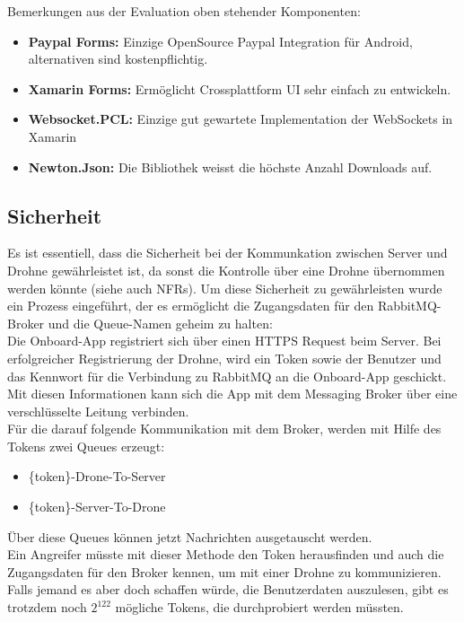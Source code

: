 Bemerkungen aus der Evaluation oben stehender Komponenten:
\begin{itemize}
	\item{\textbf{Paypal Forms:} Einzige OpenSource Paypal Integration für Android, alternativen sind kostenpflichtig.}
	\item{\textbf{Xamarin Forms:} Ermöglicht Crossplattform UI sehr einfach zu entwickeln.}
	\item{\textbf{Websocket.PCL:} Einzige gut gewartete Implementation der WebSockets in Xamarin}
	\item{\textbf{Newton.Json:} Die Bibliothek weisst die höchste Anzahl Downloads auf.}
\end{itemize}

\subsection{Sicherheit}
Es ist essentiell, dass die Sicherheit bei der Kommunkation zwischen Server und Drohne gewährleistet ist, da sonst die Kontrolle über eine Drohne übernommen werden könnte (siehe auch NFRs). Um diese Sicherheit zu gewährleisten wurde ein Prozess eingeführt, der es ermöglicht die Zugangsdaten für den RabbitMQ-Broker und die Queue-Namen geheim zu halten: \\

Die Onboard-App registriert sich über einen HTTPS Request beim Server. Bei erfolgreicher Registrierung der Drohne, wird ein Token sowie der Benutzer und das Kennwort für die Verbindung zu RabbitMQ an die Onboard-App geschickt. Mit diesen Informationen kann sich die App mit dem Messaging Broker über eine verschlüsselte Leitung verbinden.\\

Für die darauf folgende Kommunikation mit dem Broker, werden mit Hilfe des Tokens zwei Queues erzeugt: 
\begin{itemize}
	\item \{token\}-Drone-To-Server
	\item  \{token\}-Server-To-Drone
\end{itemize}

Über diese Queues können jetzt Nachrichten ausgetauscht werden. \\

Ein Angreifer müsste mit dieser Methode den Token herausfinden und auch die Zugangsdaten für den Broker kennen, um mit einer Drohne zu kommunizieren. Falls jemand es aber doch schaffen würde, die Benutzerdaten auszulesen, gibt es trotzdem noch $2^{122}$ mögliche Tokens, die durchprobiert werden müssten. \\

